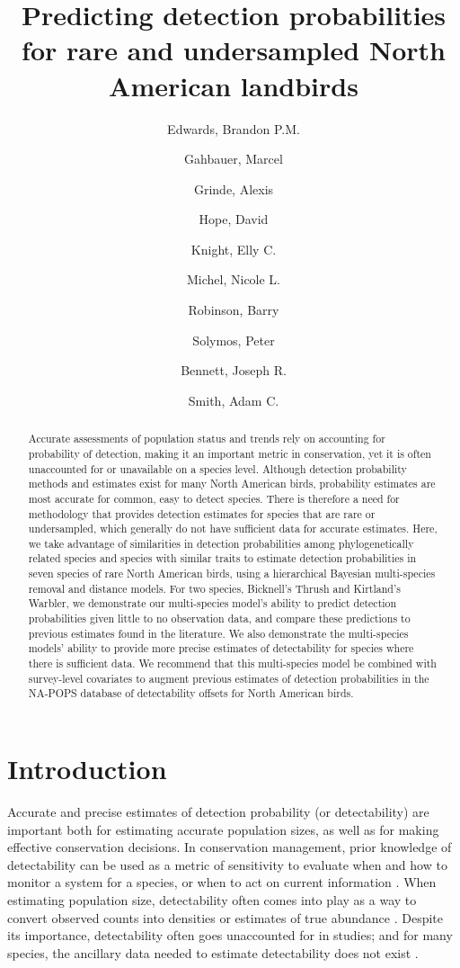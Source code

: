 \documentclass[12pt]{article}
\title{Predicting detection probabilities for rare and undersampled North American landbirds}
\author{
	Edwards, Brandon P.M.\\
	\and
	Gahbauer, Marcel\\
	\and
	Grinde, Alexis\\
	\and
	Hope, David\\
	\and
	Knight, Elly C.\\
	\and
	Michel, Nicole L.\\
	\and
	Robinson, Barry\\
	\and
	Solymos, Peter\\
	\and
	Bennett, Joseph R.\\
	\and
	Smith, Adam C.\\
}
\begin{document}
\maketitle

\begin{abstract}
	
	Accurate assessments of population status and trends rely on accounting for probability of detection, making it an important metric in conservation, yet it is often unaccounted for or unavailable on a species level. 
	Although detection probability methods and estimates exist for many North American birds, probability estimates are most accurate for common, easy to detect species. 
	There is therefore a need for methodology that provides detection estimates for species that are rare or undersampled, which generally do not have sufficient data for accurate estimates. 
	Here, we take advantage of similarities in detection probabilities among phylogenetically related species and species with similar traits to estimate detection probabilities in seven species of rare North American birds, using a hierarchical Bayesian multi-species removal and distance models. 
	For two species, Bicknell’s Thrush and Kirtland’s Warbler, we demonstrate our multi-species model’s ability to predict detection probabilities given little to no observation data, and compare these predictions to previous estimates found in the literature. 
	We also demonstrate the multi-species models’ ability to provide more precise estimates of detectability for species where there is sufficient data. 
	We recommend that this multi-species model be combined with survey-level covariates to augment previous estimates of detection probabilities in the NA-POPS database of detectability offsets for North American birds.

\end{abstract}

\section{Introduction}

\par Accurate and precise estimates of detection probability (or detectability) are important both for estimating accurate population sizes, as well as for making effective conservation decisions.
In conservation management, prior knowledge of detectability can be used as a metric of sensitivity to evaluate when and how to monitor a system for a species, or when to act on current information \citep{canessa_when_2015, bennett_when_2018}. 
When estimating population size, detectability often comes into play as a way to convert observed counts into densities or estimates of true abundance \citep{solymos_calibrating_2013, johnson_defense_2008}.
Despite its importance, detectability often goes unaccounted for in studies; and for many species, the ancillary data needed to estimate detectability does not exist \citep{bennett_how_2023}.
\end{document}
